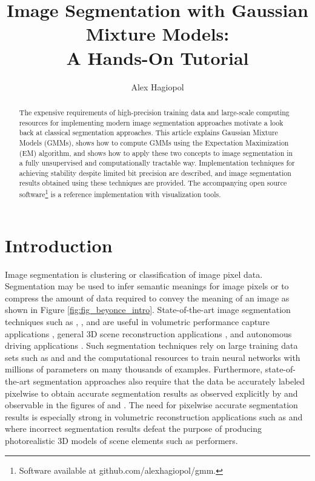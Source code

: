 \documentclass[conference]{IEEEtran}
\begin{document}
\title{\LARGE \textbf{Image Segmentation with Gaussian Mixture Models:\\A Hands-On Tutorial} \vspace{0ex}}
\author{Alex Hagiopol}
\maketitle

\begin{abstract}
 The expensive requirements of high-precision training data and large-scale computing resources for implementing modern image segmentation approaches motivate a look back at classical segmentation approaches. This article explains Gaussian Mixture Models (GMMs), shows how to compute GMMs using the Expectation Maximization (EM) algorithm, and shows how to apply these two concepts to image segmentation in a fully unsupervised and computationally tractable way. Implementation techniques for achieving stability despite limited bit precision are described, and image segmentation results obtained using these techniques are provided. The accompanying open source software\footnote{Software available at github.com/alexhagiopol/gmm.} is a reference implementation with visualization tools.
\end{abstract}

\section{Introduction}
Image segmentation is clustering or classification of image pixel data. Segmentation may be used to infer semantic meanings for image pixels or to compress the amount of data required to convey the meaning of an image as shown in Figure \ref{fig:fig_beyonce_intro}. State-of-the-art image segmentation techniques such as \cite{DeepLab}, \cite{MaskRCNN}, and \cite{PSPNet} are useful in volumetric performance capture applications \cite{FVV} \cite{Fusion4D}, general 3D scene reconstruction applications \cite{SfSIL} \cite{IBVH}, and autonomous driving applications \cite{CityScapes}. Such segmentation techniques rely on large training data sets such as \cite{COCO} and \cite{CityScapes} and the computational resources to train neural networks with millions of parameters on many thousands of examples. Furthermore, state-of-the-art segmentation approaches also require that the data be accurately labeled pixelwise to obtain accurate segmentation results as observed explicitly by \cite{SSS} and observable in the figures of \cite{DeepLab} and \cite{MaskRCNN}. The need for pixelwise accurate segmentation results is especially strong in volumetric reconstruction applications such as \cite{SfSIL} and \cite{IBVH} where incorrect segmentation results defeat the purpose of producing photorealistic 3D models of scene elements such as performers. 
\end{document}
